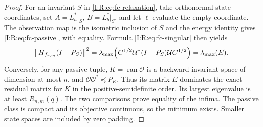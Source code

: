 \begin{proof}
For an invariant $S$ in \eqref{I:R:eq:fc-relaxation}, take orthonormal state
coordinates, set $A=L_a^*|_S$, $B=L_b^*|_S$, and let $\ell$ evaluate the empty
coordinate. The observation map is the isometric inclusion of $S$ and the
energy identity gives \eqref{I:R:eq:fc-passive}, with equality. Formula
\eqref{I:R:eq:fc-singular} then yields
\[
 \left\lVert H_{f_{r,m}}(I-P_S)\right\rVert^2
 =\lambda_{\max}\!\left(C^{1/2}\mathcal U^*(I-P_S)\mathcal U C^{1/2}\right)
 =\lambda_{\max}(E).
\]
Conversely, for any passive tuple, $K=\operatorname{ran}\mathcal O$ is a
backward-invariant space of dimension at most $n$, and
$\mathcal O\mathcal O^*\preceq P_K$. Thus its matrix $E$ dominates the exact
residual matrix for $K$ in the positive-semidefinite order. Its largest
eigenvalue is at least $R_{n,m}(q)$. The two comparisons prove equality of the
infima. The passive class is compact and its objective continuous, so the
minimum exists. Smaller state spaces are included by zero padding.
\end{proof}
